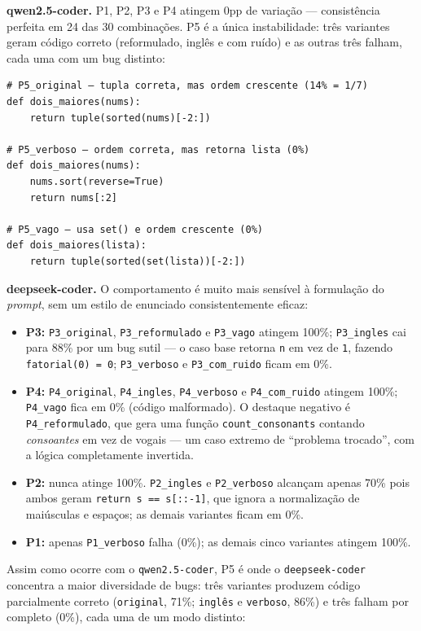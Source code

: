 \documentclass[12pt,
    english,
    french,
    spanish,
    brazil,
    ]{article}
\begin{document}
\textbf{qwen2.5-coder.} P1, P2, P3 e P4 atingem 0pp de variação — consistência perfeita em 24 das 30 combinações. P5 é a única instabilidade: três variantes geram código correto (reformulado, inglês e com ruído) e as outras três falham, cada uma com um bug distinto:

\begin{lstlisting}[style=python, caption={Falhas de qwen2.5-coder em P5 com temperatura zero}]
# P5_original — tupla correta, mas ordem crescente (14% = 1/7)
def dois_maiores(nums):
    return tuple(sorted(nums)[-2:])

# P5_verboso — ordem correta, mas retorna lista (0%)
def dois_maiores(nums):
    nums.sort(reverse=True)
    return nums[:2]

# P5_vago — usa set() e ordem crescente (0%)
def dois_maiores(lista):
    return tuple(sorted(set(lista))[-2:])
\end{lstlisting}

\textbf{deepseek-coder.} O comportamento é muito mais sensível à formulação do \textit{prompt}, sem um estilo de enunciado consistentemente eficaz:

\begin{itemize}
    \item \textbf{P3:} \texttt{P3\_original}, \texttt{P3\_reformulado} e \texttt{P3\_vago} atingem 100\%; \texttt{P3\_ingles} cai para 88\% por um bug sutil — o caso base retorna \texttt{n} em vez de \texttt{1}, fazendo \texttt{fatorial(0) = 0}; \texttt{P3\_verboso} e \texttt{P3\_com\_ruido} ficam em 0\%.
    \item \textbf{P4:} \texttt{P4\_original}, \texttt{P4\_ingles}, \texttt{P4\_verboso} e \texttt{P4\_com\_ruido} atingem 100\%; \texttt{P4\_vago} fica em 0\% (código malformado). O destaque negativo é \texttt{P4\_reformulado}, que gera uma função \texttt{count\_consonants} contando \textit{consoantes} em vez de vogais — um caso extremo de ``problema trocado'', com a lógica completamente invertida.
    \item \textbf{P2:} nunca atinge 100\%. \texttt{P2\_ingles} e \texttt{P2\_verboso} alcançam apenas 70\% pois ambos geram \texttt{return s == s[::-1]}, que ignora a normalização de maiúsculas e espaços; as demais variantes ficam em 0\%.
    \item \textbf{P1:} apenas \texttt{P1\_verboso} falha (0\%); as demais cinco variantes atingem 100\%.
\end{itemize}

Assim como ocorre com o \texttt{qwen2.5-coder}, P5 é onde o \texttt{deepseek-coder} concentra a maior diversidade de bugs: três variantes produzem código parcialmente correto (\texttt{original}, 71\%; \texttt{inglês} e \texttt{verboso}, 86\%) e três falham por completo (0\%), cada uma de um modo distinto:
\end{document}
